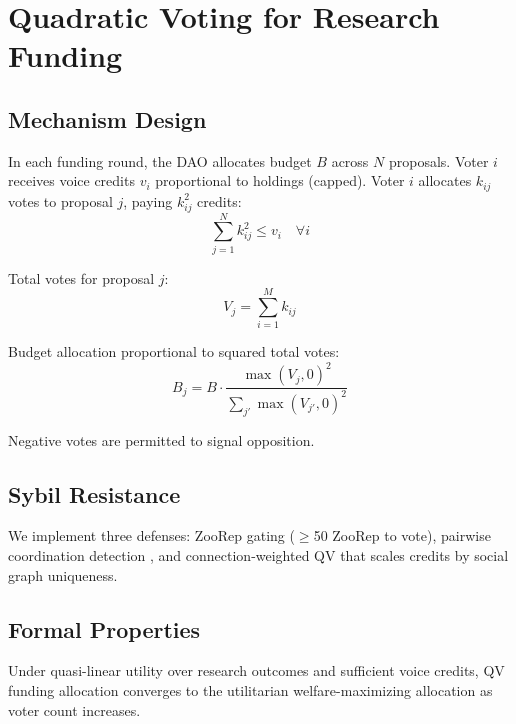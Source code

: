\section{Quadratic Voting for Research Funding}

\label{sec:qv}

\subsection{Mechanism Design}

In each funding round, the DAO allocates budget $B$ across $N$ proposals.
Voter $i$ receives voice credits $v_i$ proportional to \ZOO{} holdings
(capped). Voter $i$ allocates $k_{ij}$ votes to proposal $j$, paying
$k_{ij}^2$ credits:
\begin{equation}
  \sum_{j=1}^{N} k_{ij}^2 \leq v_i \quad \forall i
\end{equation}

Total votes for proposal $j$:
\begin{equation}
  V_j = \sum_{i=1}^{M} k_{ij}
\end{equation}

Budget allocation proportional to squared total votes:
\begin{equation}
  B_j = B \cdot \frac{\max(V_j, 0)^2}{\sum_{j'} \max(V_{j'}, 0)^2}
\end{equation}

Negative votes are permitted to signal opposition.

\subsection{Sybil Resistance}

We implement three defenses: ZooRep gating ($\geq$50 ZooRep to vote),
pairwise coordination detection \citep{buterin2019flexible}, and
connection-weighted QV that scales credits by social graph uniqueness.

\subsection{Formal Properties}

\begin{theorem}
Under quasi-linear utility over research outcomes and sufficient voice
credits, QV funding allocation converges to the utilitarian
welfare-maximizing allocation as voter count increases.
\end{theorem}

